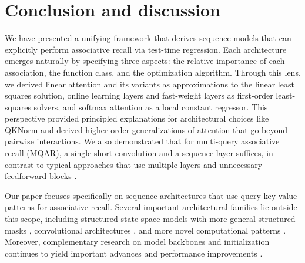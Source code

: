 \documentclass[notitlepage, 11pt]{article}
\begin{document}
\section{Conclusion and discussion}\label{sec:discussion}

We have presented a unifying framework that derives sequence models that can explicitly perform associative recall via test-time regression. Each architecture emerges naturally by specifying three aspects: the relative importance of each association, the function class, and the optimization algorithm. Through this lens, we derived linear attention and its variants as approximations to the linear least squares solution, online learning layers and fast-weight layers as first-order least-squares solvers, and softmax attention as a local constant regressor.
This perspective provided principled explanations for architectural choices like QKNorm and derived higher-order generalizations of attention that go beyond pairwise interactions.
We also demonstrated that for multi-query associative recall (MQAR), a single short convolution and a sequence layer suffices, in contrast to typical approaches that use multiple layers and unnecessary feedforward blocks \citep{Arora2023ZoologyMeasuringImproving}.

Our paper focuses specifically on sequence architectures that use query-key-value patterns for associative recall.
Several important architectural families lie outside this scope, including structured state-space models with more general structured masks \citep{Dao2024TransformersAreSSMs}, convolutional architectures \citep{Shi2023SequenceModelingMultiresolutiona,Poli2023HyenaHierarchyLarger,Gehring2017ConvolutionalSequenceSequence,Gu2021EfficientlyModelingLong,Bradbury2017QuasirecurrentNeuralNetworks,Smith2023SimplifiedStateSpace,Hochreiter1997LongShortTermMemory}, and more novel computational patterns \citep{Qin2023ToeplitzNeuralNetwork,Ren2023SparseModularActivation}. Moreover, complementary research on model backbones and initialization continues to yield important advances and performance improvements \citep{Gu2024MambaLinearTimeSequence,Dao2024TransformersAreSSMs,Orvieto2023ResurrectingRecurrentNeural,Mehta2023LongRangeLanguage,Hua2022TransformerQualityLinear}.
\end{document}
